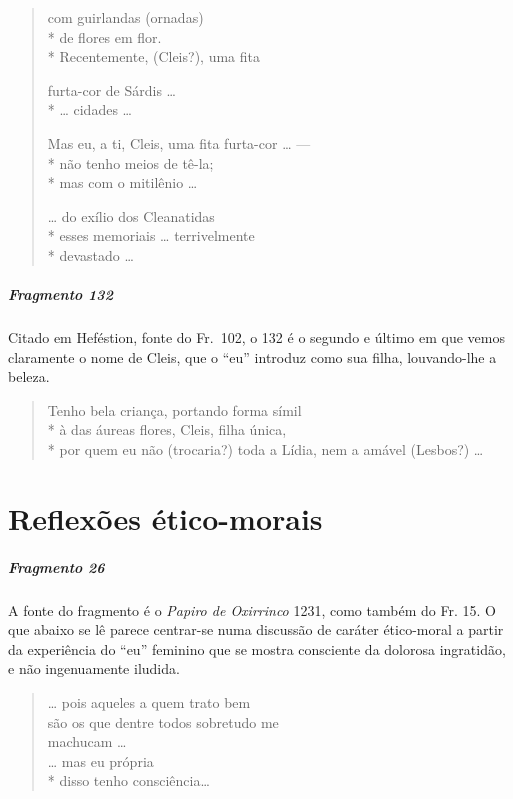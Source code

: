 {\begin{verse}
com guirlandas (ornadas)\\*
de flores em flor.\\*
Recentemente, (Cleis?), uma fita

furta-cor de Sárdis \ldots{}\\*
\ldots{} cidades \ldots{}

Mas eu, a ti, Cleis, uma fita furta-cor \ldots{} ---\\*
não tenho meios de tê-la; \\*
mas com o mitilênio \ldots{}


\ldots{} do exílio dos Cleanatidas\\*
esses memoriais \ldots{} terrivelmente\\*
devastado \ldots{}
\end{verse}

\paragraph{Fragmento 132}

{\small Citado em Heféstion, fonte do Fr.~102, o 132 é o segundo e último em que vemos
claramente o nome de Cleis, que o “eu” introduz como sua filha, louvando-lhe a
beleza.}

\begin{verse}
Tenho bela criança, portando forma símil\\*
à das áureas flores, Cleis, filha única,\\*
por quem eu não (trocaria?) toda a Lídia, nem a amável (Lesbos?) \ldots{}
\end{verse}


\chapter{Reflexões ético-morais}


\paragraph{Fragmento 26}

{\small A fonte do fragmento é o \textit{Papiro de Oxirrinco} 1231, como também do Fr.
15. O que abaixo se lê parece centrar-se numa discussão de caráter ético-moral
a partir da experiência do “eu” feminino que se mostra consciente da dolorosa
ingratidão, e não ingenuamente iludida.}

\begin{verse}
\ldots{} pois aqueles a quem trato bem\\
são os que dentre todos sobretudo me\\
machucam \ldots{}\\
\ldots{} mas eu própria\\*
disso tenho consciência\ldots{}
\end{verse}

}
